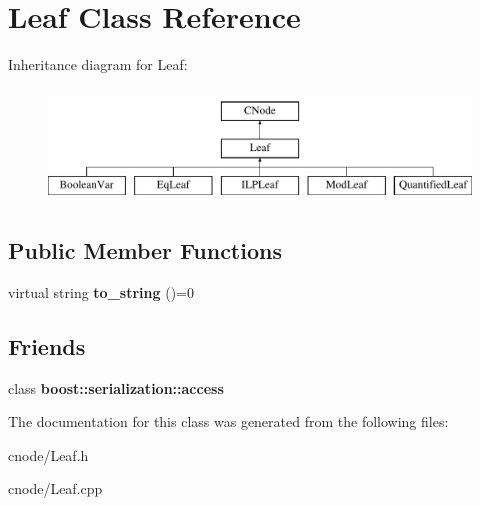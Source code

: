\hypertarget{classLeaf}{\section{\-Leaf \-Class \-Reference}
\label{classLeaf}
}
\-Inheritance diagram for \-Leaf\-:\begin{figure}[H]
\begin{center}
\leavevmode
\includegraphics[height=3.000000cm]{classLeaf}
\end{center}
\end{figure}
\subsection*{\-Public \-Member \-Functions}
\begin{DoxyCompactItemize}
\item 
\hypertarget{classLeaf_aefbb7d9d2a72b85db191acbe798b6787}{virtual string {\bfseries to\-\_\-string} ()=0}\label{classLeaf_aefbb7d9d2a72b85db191acbe798b6787}

\end{DoxyCompactItemize}
\subsection*{\-Friends}
\begin{DoxyCompactItemize}
\item 
\hypertarget{classLeaf_ac98d07dd8f7b70e16ccb9a01abf56b9c}{class {\bfseries boost\-::serialization\-::access}}\label{classLeaf_ac98d07dd8f7b70e16ccb9a01abf56b9c}

\end{DoxyCompactItemize}


\-The documentation for this class was generated from the following files\-:\begin{DoxyCompactItemize}
\item 
cnode/\-Leaf.\-h\item 
cnode/\-Leaf.\-cpp\end{DoxyCompactItemize}
